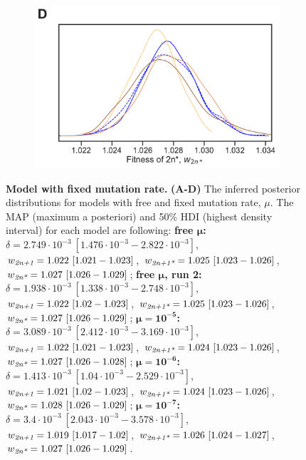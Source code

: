 \documentclass[12pt]{extarticle}
\newcommand{\anwt}{\emph{2n+1}}
\newcommand{\eumt}{\emph{2n*}}
\newcommand{\anmt}{\emph{2n+1*}}
\begin{document}
\begin{figure}[h!]
\begin{subfigure}{0.45\textwidth}
  \end{subfigure}
    \begin{subfigure}{0.45\textwidth}
      \includegraphics[width=\textwidth]{../figures/mu-D.pdf}      
    \end{subfigure}
  \caption{
    \textbf{Model with fixed mutation rate.}  \textbf{(A-D)} The inferred posterior distributions for models with free and fixed mutation rate, $\mu$. The MAP (maximum a posteriori) and 50\% HDI (highest density interval) for each model are following: 
\textbf{free $\boldsymbol{\mu}$:}
$\delta=2.749\cdot10^{-3}\ [1.476\cdot10^{-3}-2.822\cdot10^{-3}]$,
$w_{\anwt}=1.022\ [1.021-1.023]$,
$w_{\anmt}=1.025\ [1.023-1.026]$,
$w_{\eumt}=1.027\ [1.026-1.029]$;
\textbf{free $\boldsymbol{\mu}$, run 2:}
$\delta=1.938\cdot10^{-3}\ [1.338\cdot10^{-3}-2.748\cdot10^{-3}]$,
$w_{\anwt}=1.022\ [1.02-1.023]$,
$w_{\anmt}=1.025\ [1.023-1.026]$,
$w_{\eumt}=1.027\ [1.026-1.029]$;
\textbf{$\boldsymbol{\mu=10^{-5}}$:}
$\delta=3.089\cdot10^{-3}\ [2.412\cdot10^{-3}-3.169\cdot10^{-3}]$,
$w_{\anwt}=1.022\ [1.021-1.023]$,
$w_{\anmt}=1.024\ [1.023-1.026]$,
$w_{\eumt}=1.027\ [1.026-1.028]$;
\textbf{$\boldsymbol{\mu=10^{-6}}$:}
$\delta=1.413\cdot10^{-3}\ [1.04\cdot10^{-3}-2.529\cdot10^{-3}]$,
$w_{\anwt}=1.021\ [1.02-1.023]$,
$w_{\anmt}=1.024\ [1.023-1.026]$,
$w_{\eumt}=1.028\ [1.026-1.029]$;
\textbf{$\boldsymbol{\mu=10^{-7}}$:}
$\delta=3.4\cdot10^{-3}\ [2.043\cdot10^{-3}-3.578\cdot10^{-3}]$,
$w_{\anwt}=1.019\ [1.017-1.02]$,
$w_{\anmt}=1.026\ [1.024-1.027]$,
$w_{\eumt}=1.027\ [1.026-1.029]$.
\label{fig:mu}
  }
  \end{figure}
\end{document}
